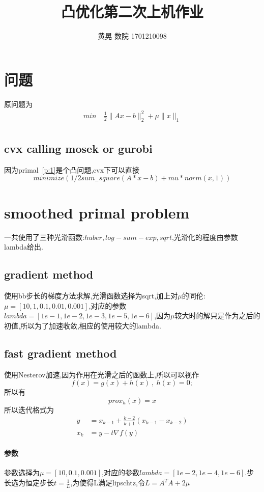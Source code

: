 \documentclass[UTF8]{ctexart}
\author{黄晃 数院 1701210098 }
\title{凸优化第二次上机作业}
\begin{document}
  \maketitle
  \section{问题}
  原问题为
  \begin{equation}\label{p:1}
    \begin{split}
       min\  & \frac{1}{2}\|Ax-b \|_{2}^{2} + \mu \|x\|_{1} \\
    \end{split}
  \end{equation}
  \subsection{cvx calling mosek or gurobi}
  因为primal~\ref{p:1}是个凸问题,cvx下可以直接
  $$minimize(1/2sum_{-}square(A*x-b)+mu*norm(x,1))$$


  \section{smoothed primal problem}
  一共使用了三种光滑函数:$huber,log-sum-exp,sqrt$,光滑化的程度由参数lambda给出.
  \subsection{gradient method}
  使用bb步长的梯度方法求解,光滑函数选择为sqrt,加上对$\mu$的同伦:$\mu=[10,1,0.1,0.01,0.001]$,对应的参数$lambda=[1e-1,1e-2,1e-3,1e-5,1e-6]$,因为$\mu$较大时的解只是作为之后的初值,所以为了加速收敛,相应的使用较大的lambda.
  \subsection{fast gradient method}
  使用Nesterov加速,因为作用在光滑之后的函数上,所以可以视作
  $$
  f(x) = g(x)+h(x)\ ,\ h(x)=0; 
  $$
  所以有
  $$prox_{h}(x)=x$$
  所以迭代格式为
      \begin{equation}
    \begin{split}
    y &= x_{k-1} + \frac{k-2}{k+1}(x_{k-1}-x_{k-2}) \\
    x_{k}&= y - t\nabla f(y)
    \end{split}
  \end{equation}
  \paragraph{参数}
  参数选择为$\mu=[10,0.1,0.001]$,对应的参数$lambda=[1e-2,1e-4,1e-6]$.步长选为恒定步长$t=\frac{1}{L}$,为使得L满足lipschtz,令$L = A^{T}A + 2\mu$
\end{document}

